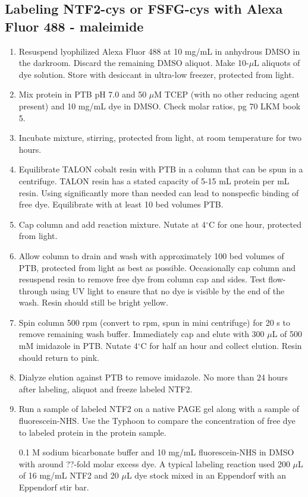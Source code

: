 \subsection{Labeling NTF2-cys or FSFG-cys with Alexa Fluor 488 - maleimide}
\begin{enumerate}
\item Resuspend lyophilized Alexa Fluor 488 at 10 mg/mL in anhydrous DMSO in the darkroom.  Discard the remaining DMSO aliquot.  Make 10-$\mu$L aliquots of dye solution. Store with desiccant in ultra-low freezer, protected from light.
\item Mix protein in PTB pH 7.0 and 50 $\mu$M TCEP (with no other reducing agent present) and 10 mg/mL dye in DMSO.  Check molar ratios, pg 70 LKM book 5.
\item Incubate mixture, stirring, protected from light, at room temperature for two hours.
\item Equilibrate TALON cobalt resin with PTB in a column that can be spun in a centrifuge.  TALON resin has a stated capacity of 5-15 mL protein per mL resin.  Using significantly more than needed can lead to nonspecfic binding of free dye.  Equilibrate with at least 10 bed volumes PTB.
\item Cap column and add reaction mixture.  Nutate at 4$^\circ$C for one hour, protected from light.
\item Allow column to drain and wash with approximately 100 bed volumes of PTB, protected from light as best as possible.  Occasionally cap column and resuspend resin to remove free dye from column cap and sides.  Test flow-through using UV light to ensure that no dye is visible by the end of the wash.  Resin should still be bright yellow.
\item Spin column 500 rpm (convert to rpm, spun in mini centrifuge) for 20 s to remove remaining wash buffer.  Immediately cap and elute with 300 $\mu$L of 500 mM imidazole in PTB.  Nutate 4$^\circ$C for half an hour and collect elution.  Resin should return to pink.
\item Dialyze elution against PTB to remove imidazole.  No more than 24 hours after labeling, aliquot and freeze labeled NTF2.
\item Run a sample of labeled NTF2 on a native PAGE gel along with a sample of fluorescein-NHS.  Use the Typhoon to compare the concentration of free dye to labeled protein in the protein sample.



0.1 M sodium bicarbonate buffer and 10 mg/mL fluorescein-NHS in DMSO with around ??-fold molar excess dye.  A typical labeling reaction used 200 $\mu$L of 16 mg/mL NTF2 and 20 $\mu$L dye stock mixed in an Eppendorf with an Eppendorf stir bar.
\end{enumerate}

